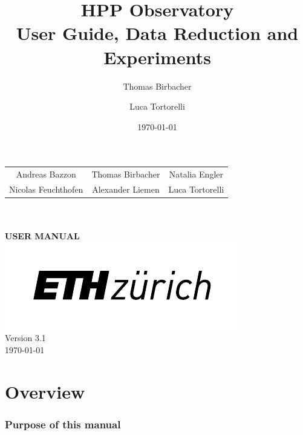 \documentclass[a4paper, 11pt, fleqn]{memoir}
\begin{document}

\date{\today}
\author{Thomas Birbacher \and Luca Tortorelli}
\title{HPP Observatory \\ User Guide, Data Reduction and Experiments}


\begin{titlingpage}
    \begin{center}
        \vspace{4cm}
        {\large\bfseries
        \begin{tabular}{ccc}
            Andreas Bazzon & Thomas Birbacher & Natalia Engler\\
            Nicolas Feuchthofen & Alexander Liemen & Luca Tortorelli
        \end{tabular}
        }\\
        \vspace{3cm}
        {}\\
        \vspace{0.6cm}
        {\LARGE\bfseries {} USER MANUAL}\\
        \vfill
        \includegraphics{eth-logo}\\
        Version 3.1\\
        \today
    \end{center}
\end{titlingpage}

\newcommand{\software}[1]{\texttt{#1}}

\frontmatter

\chapter{Overview}

\subsection*{Purpose of this manual}
\end{document}
